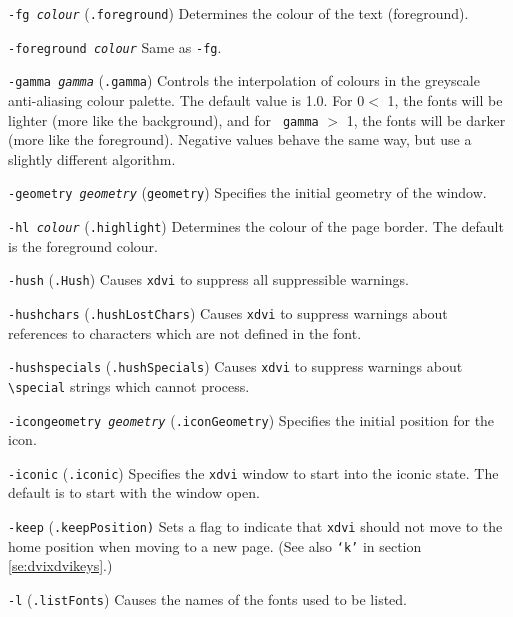 \begin{list}
\item[\tt-fg \em colour]
({\tt .foreground})
Determines the colour of the text (foreground).

\item[\tt-foreground \em colour]
Same as {\tt-fg}.

\item[\tt-gamma \em gamma] ({\tt .gamma}) Controls the interpolation of colours
in the greyscale anti-aliasing colour palette. The default value is 1.0. For
0$<$ 1, the fonts will be lighter (more like the background), and for {\tt
gamma} $>$ 1, the fonts will be darker (more like the foreground). Negative
values behave the same way, but use a slightly different algorithm.

\item[\tt-geometry \em geometry]
({\tt *geometry})
Specifies the initial geometry of the window.

\item[\tt-hl \em colour]
({\tt .highlight})
Determines the colour of the page border. The default is the foreground colour.

\item[\tt-hush]
({\tt .Hush})
Causes \verb+xdvi+ to suppress all suppressible warnings.

\item[\tt-hushchars]
({\tt .hushLostChars})
Causes \verb+xdvi+ to suppress warnings about references to characters which are not
defined in the font.

\item[\tt-hushspecials]
({\tt .hushSpecials})
Causes \verb+xdvi+ to suppress warnings about  \hbox{\verb|\special|} strings which
cannot process.

\item[\tt-icongeometry \em geometry]
({\tt .iconGeometry})
Specifies the initial position for the icon.

\item[\tt-iconic]
({\tt .iconic})
Specifies the \verb+xdvi+ window to start into the iconic state. The default is to
start with the window open.

\item[\tt-keep]
({\tt .keepPosition)}
Sets a flag to indicate that \verb+xdvi+ should not move to the home position when
moving to a new page. (See also {\tt `k'} in section \ref{se:dvixdvikeys}.)

\item[\tt-l]
({\tt .listFonts})
Causes the names of the fonts used to be listed.


\end{list}
